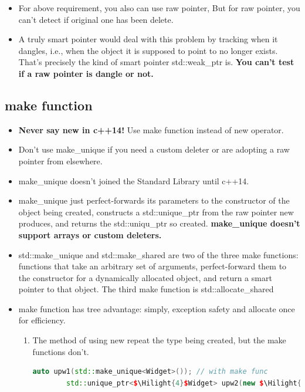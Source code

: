 \documentclass[a4paper,12pt,twoside]{book}
\newcommand{\Hilight}[1]{\makebox[0pt][l]{\color{yellow}\rule[-3pt]{#1em}{11pt}}}
\begin{document}
\begin{itemize}
\item For above requirement, you also can use raw pointer, But for raw pointer, you can't detect if original one has been delete. 

\item A truly smart pointer would deal with this problem by tracking
when it dangles, i.e., when the object it is supposed to point to no longer exists. That's precisely the kind of smart pointer std::weak\_ptr is. \textbf{You can't test if a raw pointer is dangle or not.}
\end{itemize}

\subsection{make function}
\begin{itemize}
	\item \textbf{Never say new in c++14!} Use make function instead of new operator.
	
	\item Don't use make\_unique if you need a custom deleter or are adopting a raw pointer from elsewhere.
	
	\item make\_unique doesn't joined the Standard Library until c++14.
	
	\item make\_unique just perfect-forwards its parameters to the constructor of the object being created, constructs a std::unique\_ptr from the raw pointer new produces, and returns the std::uniqu\_ptr so created. \textbf{make\_unique doesn't support arrays or custom deleters.}
	
	\item std::make\_unique and std::make\_shared are two of the three make functions: functions that take an arbitrary set of arguments, perfect-forward them to the constructor for a dynamically allocated object, and return a smart pointer to that object. The third make function is std::allocate\_shared
	
	\item make function has tree advantage: simply, exception safety and allocate once for efficiency.
	
	\begin{enumerate}
		\item The method of using new repeat the type being created, but the make functions don't.  
		\begin{lstlisting}[frame=single, language=c++, mathescape=true]
		auto upw1(std::make_unique<Widget>()); // with make func
		std::unique_ptr<$\Hilight{4}$Widget> upw2(new $\Hilight{4}$Widget); // without make func
		

\end{lstlisting}
\end{enumerate}
\end{itemize}
\end{document}
